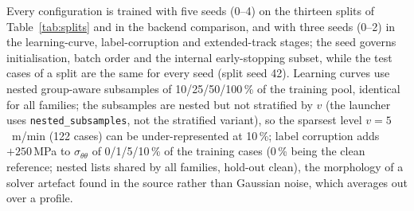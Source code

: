 \documentclass[subscriptcorrection,upint,varvw,barcolor=Goldenrod3,mathalfa=cal=euler,balance,hyphenate,french,pdf-a]{asmejour} %
\begin{document}
Every configuration is trained with five seeds (0--4) on the thirteen splits of
Table~\ref{tab:splits} and in the backend comparison, and with three seeds (0--2)
in the learning-curve, label-corruption and extended-track stages;
the seed governs initialisation, batch order and the internal early-stopping subset, %
while the test cases of a split are the same for every seed (split seed 42).
Learning curves use nested group-aware subsamples of 10/25/50/100\,\% of the
training pool, identical for all families;
the subsamples are nested but not stratified by $v$ (the launcher uses
\texttt{nested\_subsamples}, not the stratified variant), so the sparsest level
$v = 5$~m/min (122 cases) can be under-represented at 10\,\%;
label corruption adds $+250$\,MPa to $\sigma_{\theta\theta}$ of 0/1/5/10\,\% of
the training cases (0\,\% being the clean reference; nested lists shared by all
families, hold-out clean), the morphology of a solver artefact found in the
source rather than Gaussian noise, which averages out over a profile.
\end{document}
